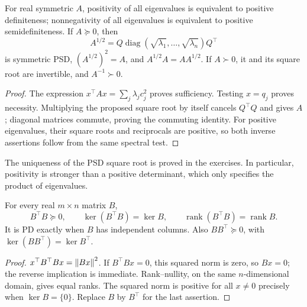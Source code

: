 \begin{proposition}\label{prop:09:positive}
For real symmetric \(A\), positivity of all eigenvalues is equivalent
to positive definiteness; nonnegativity of all eigenvalues is equivalent
to positive semidefiniteness.
If \(A\succeq0\), then
\[
 A^{1/2}=Q\operatorname{diag}(\sqrt{\lambda_1},\ldots,\sqrt{\lambda_n})Q^\top
\]
is symmetric PSD, \((A^{1/2})^2=A\), and \(A^{1/2}A=AA^{1/2}\).
If \(A\succ0\), it and its square root are invertible, and
\(A^{-1}\succ0\).
\end{proposition}
\begin{proof}
The expression \(x^\top Ax=\sum_j\lambda_jc_j^2\) proves sufficiency.
Testing \(x=q_j\) proves necessity. Multiplying the proposed square root
by itself cancels \(Q^\top Q\) and gives \(A\); diagonal matrices
commute, proving the commuting identity.
For positive eigenvalues, their square roots and reciprocals are positive,
so both inverse assertions follow from the same spectral test.
\end{proof}
The uniqueness of the PSD square root is proved in the exercises.
In particular, positivity is stronger than a positive determinant,
which only specifies the product of eigenvalues.

\begin{proposition}\label{prop:09:gram}
For every real \(m\times n\) matrix \(B\),
\[
 B^\top B\succeq0,\qquad
 \ker(B^\top B)=\ker B,\qquad
 \operatorname{rank}(B^\top B)=\operatorname{rank}B.
\]
It is PD exactly when \(B\) has independent columns.
Also \(BB^\top\succeq0\), with \(\ker(BB^\top)=\ker B^\top\).
\end{proposition}
\begin{proof}
\(x^\top B^\top Bx=\left\lVert Bx\right\rVert^2\).
If \(B^\top Bx=0\), this squared norm is zero, so \(Bx=0\);
the reverse implication is immediate. Rank--nullity, on the same
\(n\)-dimensional domain, gives equal ranks.
The squared norm is positive for all \(x\ne0\) precisely when
\(\ker B=\{0\}\). Replace \(B\) by \(B^\top\) for the last assertion.
\end{proof}

